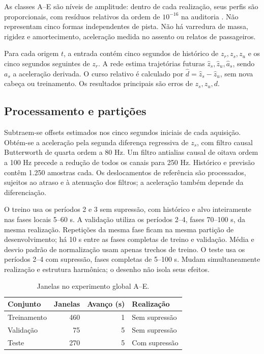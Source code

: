 \documentclass[conference]{IEEEtran}
\begin{document}
As classes A--E são níveis de amplitude: dentro de cada realização, seus perfis são proporcionais, com resíduos relativos da ordem de $10^{-16}$ na auditoria \cite{repo}. Não representam cinco formas independentes de pista. Não há varredura de massa, rigidez e amortecimento, aceleração medida no assento ou relatos de passageiros.

Para cada origem $t$, a entrada contém cinco segundos de histórico de $z_r,z_s,z_u$ e os cinco segundos seguintes de $z_r$. A rede estima trajetórias futuras $\hat z_s,\hat z_u,\hat a_s$, sendo $a_s$ a aceleração derivada. O curso relativo é calculado por $\hat d=\hat z_s-\hat z_u$, sem nova cabeça ou treinamento. Os resultados principais são erros de $z_s,z_u,d$.

\subsection{Processamento e partições}
Subtraem-se offsets estimados nos cinco segundos iniciais de cada aquisição. Obtém-se a aceleração pela segunda diferença regressiva de $z_s$, com filtro causal Butterworth de quarta ordem a 80 Hz. Um filtro antialias causal de oitava ordem a 100 Hz precede a redução de todos os canais para 250 Hz. Histórico e previsão contêm 1.250 amostras cada. Os deslocamentos de referência são processados, sujeitos ao atraso e à atenuação dos filtros; a aceleração também depende da diferenciação.

O treino usa os períodos 2 e 3 sem supressão, com histórico e alvo inteiramente nas fases locais 5--60 s. A validação utiliza os períodos 2--4, fases 70--100 s, da mesma realização. Repetições da mesma fase ficam na mesma partição de desenvolvimento; há 10 s entre as fases completas de treino e validação. Média e desvio padrão de normalização usam apenas trechos de treino. O teste usa os períodos 2--4 com supressão, fases completas de 5--100 s. Mudam simultaneamente realização e estrutura harmônica; o desenho não isola seus efeitos.

\begin{table}[t]
\caption{Janelas no experimento global A--E.}
\label{tab:data}
\centering
\begin{tabular}{lrrl}\toprule
Conjunto & Janelas & Avanço (s) & Realização\\\midrule
Treinamento & 460 & 1 & Sem supressão\\
Validação & 75 & 5 & Sem supressão\\
Teste & 270 & 5 & Com supressão\\\bottomrule
\end{tabular}
\end{table}
\end{document}
